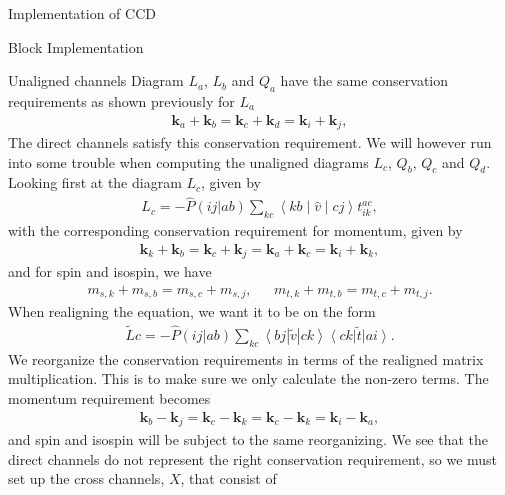 \documentclass[twoside,english]{uiofysmaster}
\begin{document}
\begin{chapter}{Implementation of CCD}
\begin{section}{Block Implementation}
		\begin{subsection}{Unaligned channels}
			Diagram $L_a$, $L_b$ and $Q_a$ have the same
                        conservation requirements as shown previously
                        for $L_a$
			\begin{align}
			 	\mathbf{k}_a + \mathbf{k}_b = \mathbf{k}_c + \mathbf{k}_d = \mathbf{k}_i + \mathbf{k}_j ,
			\end{align}
			The direct channels satisfy this conservation
                        requirement. We will however run into some
                        trouble when computing the unaligned diagrams
                        $L_c$, $Q_b$, $Q_c$ and $Q_d$. Looking first
                        at the diagram $L_c$, given by
			\begin{align}
				L_c = - \hat P(ij|ab) \sum_{kc} \left<kb\middle|\hat v\middle| cj \right> t_{ik}^{ac},
			\end{align}
			with the corresponding conservation requirement for momentum, given by
			\begin{align}
				\mathbf{k}_k + \mathbf{k}_b = \mathbf{k}_c + \mathbf{k}_j = \mathbf{k}_a + \mathbf{k}_c = \mathbf{k}_i + \mathbf{k}_k,
			\end{align}
			and for spin and isospin, we have
			\begin{align}
				m_{s,k} + m_{s,b} = m_{s,c} + m_{s,j},  \:\:\:\:\:\:\: m_{t,k} + m_{t,b} = m_{t,c} + m_{t,j}. 
			\end{align}
			When realigning the equation, we want it to be on the form
			\begin{align}
				\tilde Lc = -\hat P(ij|ab) \sum_{kc} \left<bj | \tilde v | ck \right> \left< ck \right| \tilde t \left| ai \right>.
			\end{align}
			We reorganize the conservation requirements in
                        terms of the realigned matrix
                        multiplication. This is to make sure we only
                        calculate the non-zero terms. The momentum
                        requirement becomes
			\begin{align}
				\mathbf{k}_b - \mathbf{k}_j = \mathbf{k}_c - \mathbf{k}_k = \mathbf{k}_c - \mathbf{k}_k = \mathbf{k}_i - \mathbf{k}_a,
			\end{align}
			and spin and isospin will be subject to the
                        same reorganizing. We see that the direct
                        channels do not represent the right
                        conservation requirement, so we must set up
                        the cross channels, $X$, that consist of

\end{subsection}
\end{section}
\end{chapter}
\end{document}
